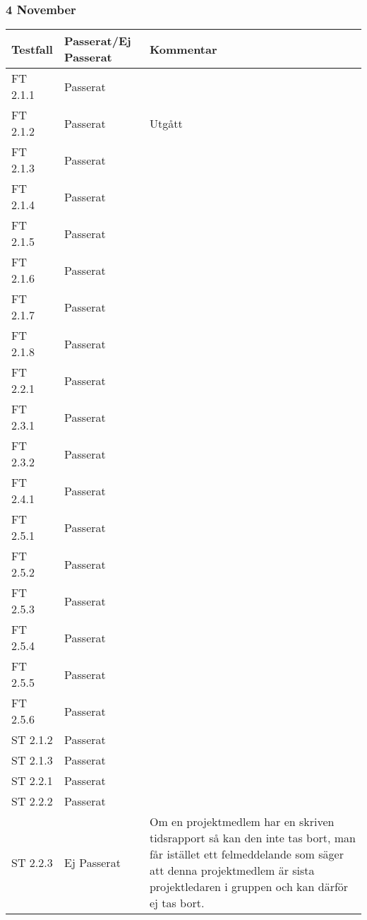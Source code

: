 \documentclass[a4paper]{article}
\begin{document}
\subsubsection{4 November}
\begin{tabular}{| l | l | p{9cm} |}
\hline
Testfall &  Passerat/Ej Passerat & Kommentar\\
\hline
FT 2.1.1 & Passerat & \\
\hline
FT 2.1.2 & Passerat & Utgått\\  
\hline
FT 2.1.3 & Passerat & \\
\hline
FT 2.1.4 & Passerat & \\
\hline
FT 2.1.5 & Passerat & \\
\hline
FT 2.1.6 & Passerat & \\
\hline
FT 2.1.7 & Passerat & \\
\hline
FT 2.1.8 & Passerat & \\
\hline
FT 2.2.1 & Passerat & \\
\hline
FT 2.3.1 & Passerat & \\
\hline
FT 2.3.2 & Passerat & \\
\hline
FT 2.4.1 & Passerat & \\
\hline
FT 2.5.1 & Passerat & \\
\hline
FT 2.5.2 & Passerat & \\
\hline
FT 2.5.3 & Passerat & \\
\hline
FT 2.5.4 & Passerat & \\
\hline
FT 2.5.5 & Passerat & \\
\hline
FT 2.5.6 & Passerat & \\
\hline
ST 2.1.2 & Passerat & \\
\hline
ST 2.1.3 & Passerat & \\
\hline
ST 2.2.1 & Passerat & \\
\hline
ST 2.2.2 & Passerat & \\
\hline
ST 2.2.3 & Ej Passerat & Om en projektmedlem har en skriven tidsrapport så kan den inte tas bort, man får istället ett felmeddelande som säger att denna projektmedlem är sista projektledaren i gruppen och kan därför ej tas bort.\\
\hline
\end{tabular}








\end{document}
